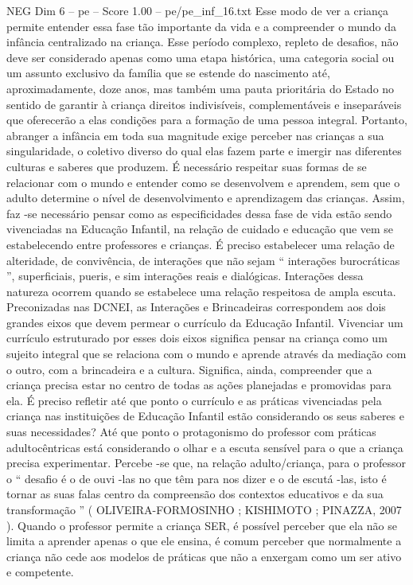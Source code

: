 \begin{textsample}{NEG Dim 6 – pe – Score 1.00 – pe/pe\_inf\_16.txt}
Esse modo de ver a criança permite entender essa fase tão importante da vida e a compreender o mundo da infância centralizado na criança.
Esse período complexo, repleto de desafios, não deve ser considerado apenas como uma etapa histórica, uma categoria social ou um assunto exclusivo da família que se estende do nascimento até, aproximadamente, doze anos, mas também uma pauta prioritária do Estado no sentido de garantir à criança direitos indivisíveis, complementáveis e inseparáveis que oferecerão a elas condições para a formação de uma pessoa integral.
Portanto, abranger a infância em toda sua magnitude exige perceber nas crianças a sua singularidade, o coletivo diverso do qual elas fazem parte e imergir nas diferentes culturas e saberes que produzem.
É necessário respeitar suas formas de se relacionar com o mundo e entender como se desenvolvem e aprendem, sem que o adulto determine o nível de desenvolvimento e aprendizagem das crianças.
Assim, faz -se necessário pensar como as especificidades dessa fase de vida estão sendo vivenciadas na Educação Infantil, na relação de cuidado e educação que vem se estabelecendo entre professores e crianças.
É preciso estabelecer uma relação de alteridade, de convivência, de interações que não sejam “ interações burocráticas ”, superficiais, pueris, e sim interações reais e dialógicas.
Interações dessa natureza ocorrem quando se estabelece uma relação respeitosa de ampla escuta.
Preconizadas nas DCNEI, as Interações e Brincadeiras correspondem aos dois grandes eixos que devem permear o currículo da Educação Infantil.
Vivenciar um currículo estruturado por esses dois eixos significa pensar na criança como um sujeito integral que se relaciona com o mundo e aprende através da mediação com o outro, com a brincadeira e a cultura.
Significa, ainda, compreender que a criança precisa estar no centro de todas as ações planejadas e promovidas para ela.
É preciso refletir até que ponto o currículo e as práticas vivenciadas pela criança nas instituições de Educação Infantil estão considerando os seus saberes e suas necessidades?
Até que ponto o protagonismo do professor com práticas adultocêntricas está considerando o olhar e a escuta sensível para o que a criança precisa experimentar.
Percebe -se que, na relação adulto/criança, para o professor o “ desafio é o de ouvi -las no que têm para nos dizer e o de escutá -las, isto é tornar as suas falas centro da compreensão dos contextos educativos e da sua transformação ” ( OLIVEIRA-FORMOSINHO ; KISHIMOTO ; PINAZZA, 2007 ).
Quando o professor permite a criança SER, é possível perceber que ela não se limita a aprender apenas o que ele ensina, é comum perceber que normalmente a criança não cede aos modelos de práticas que não a enxergam como um ser ativo e competente.

\end{textsample}
